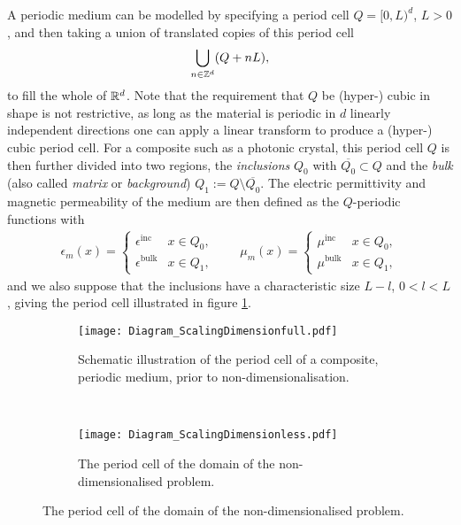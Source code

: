 A periodic medium can be modelled by specifying a period cell $Q=[0,L)^d$, $L>0$, and then taking a union of translated copies of this period cell
\begin{align*}
	\bigcup_{n\in\mathbb{Z}^d} (Q + nL),
\end{align*}
to fill the whole of $\mathbb{R}^d$.
Note that the requirement that $Q$ be (hyper-) cubic in shape is not restrictive, as long as the material is periodic in $d$ linearly independent directions one can apply a linear transform to produce a (hyper-) cubic period cell.
For a composite such as a photonic crystal, this period cell $Q$ is then further divided into two regions, the \emph{inclusions} $Q_0$ with $\overline{Q_0}\subset Q$ and the \emph{bulk} (also called \emph{matrix} or \emph{background}) $Q_1:=Q\setminus \overline{Q_0}$.
The electric permittivity and magnetic permeability of the medium are then defined as the $Q$-periodic functions with
\begin{align*}
	\epsilon_m(x) = \begin{cases} \epsilon^{\mathrm{inc}} & x\in Q_0, \\ \epsilon^{\mathrm{bulk}} & x\in Q_1, \end{cases}
	\qquad
	\mu_m(x) = \begin{cases} \mu^{\mathrm{inc}} & x\in Q_0, \\ \mu^{\mathrm{bulk}} & x\in Q_1, \end{cases}
\end{align*}
and we also suppose that the inclusions have a characteristic size $L-l$, $0<l<L$, giving the period cell illustrated in figure \ref{fig:Diagram_ScalingDimensionfull}.
\begin{figure}[t]
	\centering
	\begin{subfigure}[t]{0.45\textwidth}
		\centering
		\texttt{[image: Diagram\_ScalingDimensionfull.pdf]}
		\caption{\label{fig:Diagram_ScalingDimensionfull} Schematic illustration of the period cell of a composite, periodic medium, prior to non-dimensionalisation.}
	\end{subfigure}
	~
	\begin{subfigure}[t]{0.45\textwidth}
		\centering
		\texttt{[image: Diagram\_ScalingDimensionless.pdf]}
		\caption{\label{fig:Diagram_ScalingDimensionless} The period cell of the domain of the non-dimensionalised problem.}
	\end{subfigure}
\end{figure}

